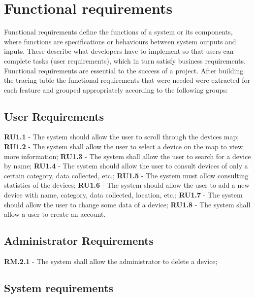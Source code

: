\documentclass{scrreprt}
\begin{document}
\section{Functional requirements}

Functional requirements define the functions of a system or its components,
where functions are specifications or behaviours between system outputs and
inputs. \cite{fulton2017chapter} These describe what developers have to implement
so that users can complete tasks (user requirements), which in turn satisfy
business requirements. \cite{wiegers2013software} Functional requirements are
essential to the success of a project.
After building the tracing table the functional requirements that were needed
were extracted for each feature and grouped appropriately according to the
following groups:

\subsection{User Requirements}

\textbf{RU1.1} - The system should allow the user to scroll through the devices map;
\newline
\textbf{RU1.2} - The system shall allow the user to select a device on the map to view more information;
\newline
\textbf{RU1.3} - The system shall allow the user to search for a device by name;
\newline
\textbf{RU1.4} - The system should allow the user to consult devices of only a certain category, data collected, etc.;
\newline
\textbf{RU1.5} - The system must allow consulting statistics of the devices;
\newline
\textbf{RU1.6} - The system should allow the user to add a new device with name, category, data collected, location, etc.;
\newline
\textbf{RU1.7} - The system should allow the user to change some data of a device;
\newline
\textbf{RU1.8} - The system shall allow a user to create an account.

\subsection{Administrator Requirements}

\textbf{RM.2.1} - The system shall allow the administrator to delete a device;

\subsection{System requirements}
\end{document}
